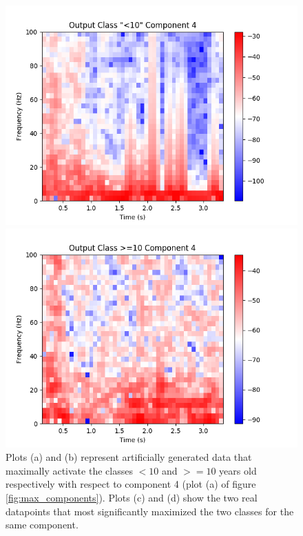 \documentclass[utf8]{frontiersSCNS} %
\begin{document}
\begin{figure}
\begin{minipage}{0.45\textwidth}
    \includegraphics[width=\linewidth]{max_act/real_0_4.png}
  \end{minipage}
  \hspace*{\fill} 
  \begin{minipage}{0.45\textwidth}
    \includegraphics[width=\linewidth]{max_act/real_1_4.png}
  \end{minipage}
  \caption{Plots (a) and (b) represent artificially generated data that maximally activate the classes $<10$ and $>=10$ years old respectively with respect to component 4 (plot (a) of figure \ref{fig:max_components}). Plots (c) and (d) show the two real datapoints that most significantly maximized the two classes for the same component.}
  \label{fig:component_4}
\end{figure}
\end{document}
